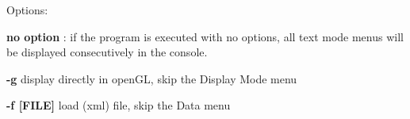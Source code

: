 Options\+:


\begin{DoxyItemize}
\item {\bfseries no option} \+: if the program is executed with no options, all text mode menus will be displayed consecutively in the console. 
\item {\bfseries -\/g} display directly in open\+GL, skip the Display Mode menu 
\item {\bfseries -\/f \mbox{[}F\+I\+LE\mbox{]}} load (xml) file, skip the Data menu 
\end{DoxyItemize}